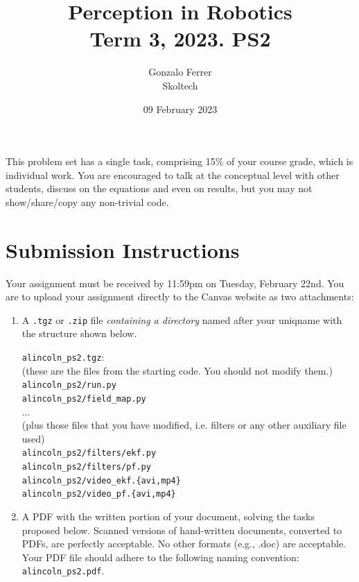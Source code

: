 \documentclass[11pt, oneside, letterpaper]{article}
\begin{document}
\title{\huge\textbf{Perception in Robotics \\  Term 3, 2023. PS2}}
\author{Gonzalo Ferrer\\Skoltech}
\date{09 February 2023}
\maketitle


This problem set has a single task, comprising 15\% of your course grade, which is individual work. You are encouraged to talk at the conceptual level with other students, discuss on the equations and even on results, but you may not show/share/copy any non-trivial code.



\section*{Submission Instructions}
Your assignment must be received by 11:59pm on Tuesday, February 22nd.  You are to upload your assignment directly to the Canvas website as two attachments:
\begin{enumerate}
\item A \texttt{.tgz} or \texttt{.zip} file \textit{containing a directory} named after your uniqname with the structure shown below.

  \texttt{alincoln\_ps2.tgz}:\\
  (these are the files from the starting code. You should not modify them.)\\
  \texttt{alincoln\_ps2/run.py}\\
  \texttt{alincoln\_ps2/field\_map.py}\\
  $\ldots$ \\
  (plus those files that you have modified, i.e. filters or any other auxiliary file used)\\
  \texttt{alincoln\_ps2/filters/ekf.py}\\
  \texttt{alincoln\_ps2/filters/pf.py}\\
  \texttt{alincoln\_ps2/video\_ekf.\{avi,mp4\}}\\
  \texttt{alincoln\_ps2/video\_pf.\{avi,mp4\}}

\item A PDF with the written portion of your document, solving the tasks proposed below. Scanned versions of   hand-written documents, converted to PDFs, are perfectly acceptable.  No   other formats (e.g., .doc) are acceptable.  Your PDF file should adhere to  the following naming convention: \texttt{alincoln\_ps2.pdf}.

\end{enumerate}
\end{document}
